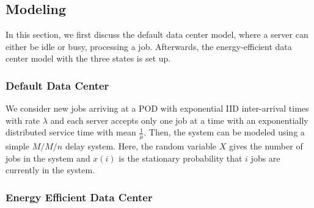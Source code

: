 \subsection{Modeling}\label{sec:cloud:data_centers:modeling}
In this section, we first discuss the default data center model, where a server can either be idle or busy, processing a job. Afterwards, the energy-efficient data center model with the three states is set up.

\subsubsection*{Default Data Center}\label{sec:cloud:data_centers:modeling:default}
We consider new jobs arriving at a \gls{POD} with exponential \gls{IID} inter-arrival times with rate \(\lambda\) and each server accepts only one job at a time with an exponentially distributed service time with mean \(\frac{1}{\mu}\).
Then, the system can be modeled using a simple \(M/M/n\) delay system.
Here, the random variable \(X\) gives the number of jobs in the system and \(x(i)\) is the stationary probability that \(i\) jobs are currently in the system.

\subsubsection*{Energy Efficient Data Center}\label{sec:cloud:data_centers:modeling:energy_efficient}